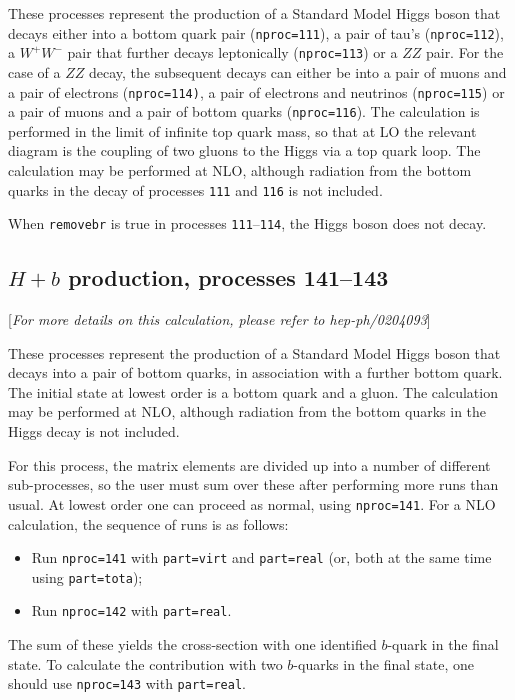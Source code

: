 \documentclass[12pt]{article}
\begin{document}
These processes represent the production of a Standard Model Higgs
boson that decays either into a bottom quark
pair ({\tt nproc=111}), a pair of tau's ({\tt nproc=112}), a $W^+W^-$ pair
that further decays leptonically ({\tt nproc=113}) or a $ZZ$ pair.
For the case of a $ZZ$ decay,
the subsequent decays can either be into a pair of muons and a pair of electrons
({\tt nproc=114)}, a pair of electrons and neutrinos ({\tt nproc=115}) or
a pair of muons and a pair of bottom quarks ({\tt nproc=116}).
The calculation is performed in the
limit of infinite top quark mass, so that at LO the relevant diagram
is the coupling of two gluons to the Higgs via a top quark loop.
The calculation may be performed at NLO, although radiation from the
bottom quarks in the decay of processes {\tt 111} and {\tt 116} is not included.

When {\tt removebr} is true in processes {\tt 111}--{\tt 114},
the Higgs boson does not decay.

\subsection{$H+b$ production, processes 141--143}
\label{subsec:Hb}

\begin{center}
[{\it For more details on this calculation, please refer to hep-ph/0204093}]
\end{center}

These processes represent the production of a Standard Model Higgs
boson that decays into a pair of bottom quarks,
in association with a further bottom quark. The initial state at lowest order
is a bottom quark and a gluon.
The calculation may be performed at NLO, although radiation from the
bottom quarks in the Higgs decay is not included.

For this process, the matrix elements are divided up into a number of
different sub-processes, so the user must sum over these after performing
more runs than usual. At lowest order one can proceed as normal, using
{\tt nproc=141}. For a NLO calculation, the sequence of runs is as follows:
\begin{itemize}
\item Run {\tt nproc=141} with {\tt part=virt} and {\tt part=real} (or, both
at the same time using {\tt part=tota});
\item Run {\tt nproc=142} with {\tt part=real}.
\end{itemize}
The sum of these yields the cross-section with one identified $b$-quark in
the final state. To calculate the contribution with two $b$-quarks in the
final state, one should use {\tt nproc=143} with {\tt part=real}.
\end{document}

